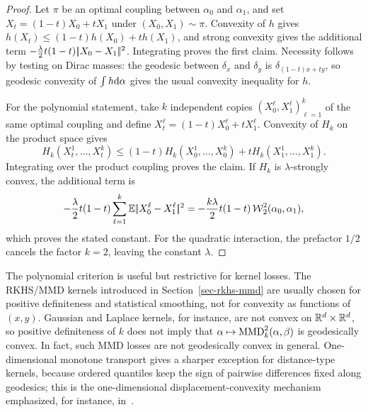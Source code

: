 \begin{proof}
	Let \(\pi\) be an optimal coupling between \(\alpha_0\) and \(\alpha_1\), and set \(X_t=(1-t)X_0+tX_1\) under \((X_0,X_1)\sim\pi\). Convexity of \(h\) gives \(h(X_t)\leq(1-t)h(X_0)+t h(X_1)\), and strong convexity gives the additional term \(-\frac{\lambda}{2}t(1-t)|\!| X_0-X_1 |\!|^2\). Integrating proves the first claim. Necessity follows by testing on Dirac masses: the geodesic between \(\delta_x\) and \(\delta_y\) is \(\delta_{(1-t)x+ty}\), so geodesic convexity of \(\int h\mathrm{d}\alpha\) gives the usual convexity inequality for \(h\).

	For the polynomial statement, take \(k\) independent copies \((X_0^\ell,X_1^\ell)_{\ell=1}^k\) of the same optimal coupling and define \(X_t^\ell=(1-t)X_0^\ell+tX_1^\ell\). Convexity of \(H_k\) on the product space gives
	\[
		H_k(X_t^1,\ldots,X_t^k)
		\leq (1-t)H_k(X_0^1,\ldots,X_0^k)+tH_k(X_1^1,\ldots,X_1^k).
	\]
	Integrating over the product coupling proves the claim. If $H_k$ is $\lambda$-strongly convex, the additional term is
	\[
		-\frac{\lambda}{2}t(1-t)
		\sum_{\ell=1}^k\mathbb{E}|\!| X_0^\ell-X_1^\ell |\!|^2
		=
		-\frac{k\lambda}{2}t(1-t)\operatorname{\mathcal{W}}_2^2(\alpha_0,\alpha_1),
	\]
	which proves the stated constant. For the quadratic interaction, the prefactor $1/2$ cancels the factor $k=2$, leaving the constant $\lambda$.
\end{proof}

The polynomial criterion is useful but restrictive for kernel losses. The RKHS/MMD kernels introduced in Section~\ref{sec-rkhs-mmd} are usually chosen for positive definiteness and statistical smoothing, not for convexity as functions of \((x,y)\). Gaussian and Laplace kernels, for instance, are not convex on \(\mathbb{R}^d\times\mathbb{R}^d\), so positive definiteness of \(k\) does not imply that \(\alpha\mapsto\operatorname{MMD}_k^2(\alpha,\beta)\) is geodesically convex. In fact, such MMD losses are not geodesically convex in general. One-dimensional monotone transport gives a sharper exception for distance-type kernels, because ordered quantiles keep the sign of pairwise differences fixed along geodesics; this is the one-dimensional displacement-convexity mechanism emphasized, for instance, in~\cite{SantambrogioBook}.

